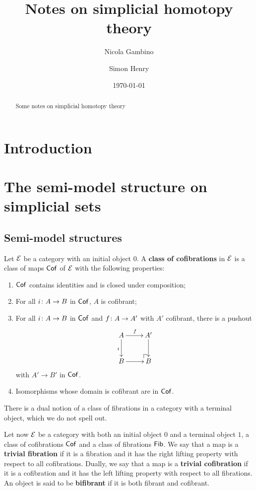 \documentclass[reqno,10pt,a4paper,oneside,draft]{amsart}
\title[]{Notes on simplicial homotopy theory}
\begin{document}
\begin{abstract}
Some notes on simplicial homotopy theory
\end{abstract}

\author{Nicola Gambino}

\author{Simon Henry}


 \date{\today}

\maketitle

\section{Introduction}

\newpage

\section{The semi-model structure on simplicial sets}

\subsection*{Semi-model structures} 

Let $\cal{E}$ be a category with an initial object $0$. A {\bf class of cofibrations} in $\cal{E}$ is
a class of maps $\Cof$ of $\cal{E}$ with the following properties:
\begin{enumerate}[(C1)]
\item $\Cof$ contains identities and is closed under composition;
\item For all $i \co A \to B$ in $\Cof$, $A$ is cofibrant;
\item For all $i \co A \to B$ in $\Cof$ and $f \co A \to A'$ with $A'$ cofibrant, there is a pushout
\[
\xymatrix{
A \ar[r]^f \ar[d]_{i}  & A' \ar[d] \\
B \ar[r] & \ulpullback B }
\]
with $A' \to B'$ in $\Cof$.
\item Isomorphisms whose domain is cofibrant are in $\Cof$.
\end{enumerate}
There is a dual notion of a class of fibrations in a category with a terminal object, which we do
not spell out.

\medskip

Let now $\cal{E}$ be a category with both an initial object $0$ and a terminal object $1$,
a class of cofibrations $\Cof$ and a class of fibrations $\Fib$. We say that a map is a {\bf trivial fibration}
if it is a fibration and it has the right lifting property with respect to all cofibrations. Dually, we say that
a map is a {\bf trivial cofibration} if it is a cofibration and it has the left lifting property with respect to
all fibrations. An object is said to be {\bf bifibrant} if it is both fibrant and cofibrant.
\end{document}
